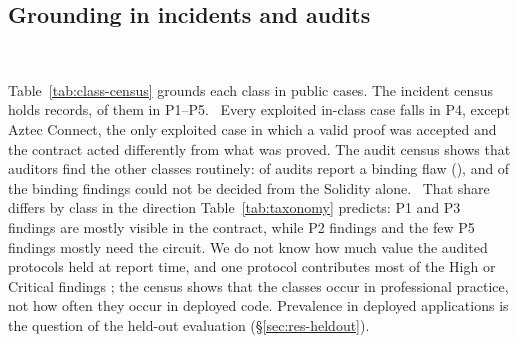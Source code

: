 \subsection{Grounding in incidents and audits}\label{sec:grounding}

\begin{table}[t]
\centering
\caption{Binding flaws in public incidents and audits, by class.
\textbf{Top:} incident and disclosure census (R1), with exploitation and USD
amounts; ``Other'' is out of scope. \textbf{Bottom:} audit census (R2), by
severity, and whether deciding the finding needs the circuit. Both samples are
convenience samples; labels are AI-proposed and await author
review\aiop{}. R1 records Aztec Connect under P5 with P1 as the alternative;
we classify it as P1(b) (\S\ref{sec:extent}) and keep the recorded class here
until that review .}
\label{tab:class-census}
\footnotesize
\setlength{\tabcolsep}{4pt}
\\[6pt]

\end{table}

Table~\ref{tab:class-census} grounds each class in public cases. The incident
census holds \RoneCases{} records, \RoneInClassCases{} of them in P1--P5.%
\
Every exploited in-class case falls in P4, except Aztec Connect, the only exploited
case in which a valid proof was accepted and the contract acted differently from
what was proved. The audit census shows that auditors find the other classes
routinely: \RtwoBindingAudits{} of \RtwoAudits{} audits report a binding flaw
(\RtwoBindingAuditShare{}), and \RtwoBindingNeedsCircuitShare{} of the
binding findings could not be decided from the Solidity alone.%
\
That share differs by class in the direction Table~\ref{tab:taxonomy}
predicts: P1 and P3 findings are mostly visible in the contract, while P2 findings and
the few P5 findings mostly need the circuit. We do not know how much value the
audited protocols held at report time, and one protocol contributes most of
the High or Critical findings \TODO{PP}; the census
shows that the classes occur in professional practice, not how often they
occur in deployed code. Prevalence in deployed applications is the question
of the held-out evaluation (\S\ref{sec:res-heldout}).
